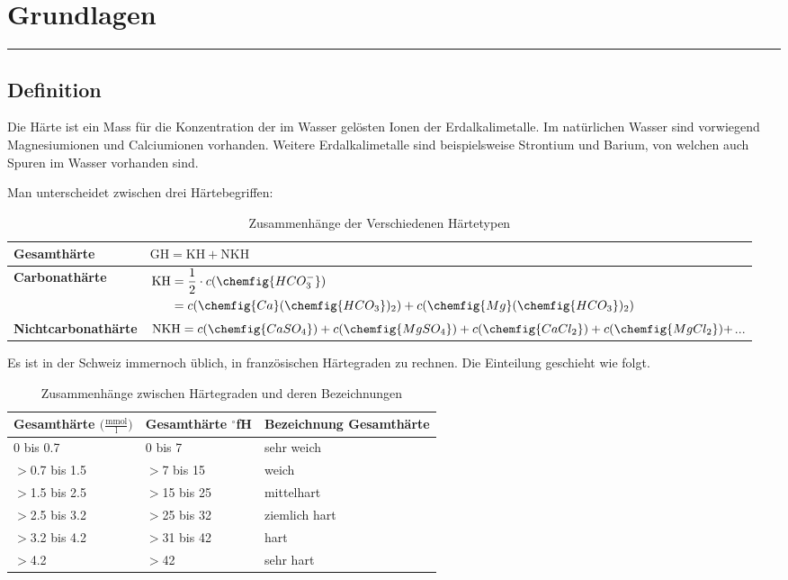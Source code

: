 \section{Grundlagen}

\rule{\linewidth}{0.5mm}
\subsection{Definition}
\begin{addmargin}[3cm]{0cm}

	Die Härte ist ein Mass für die Konzentration der im Wasser gelösten Ionen der Erdalkalimetalle. Im natürlichen Wasser sind vorwiegend Magnesiumionen und Calciumionen vorhanden.
	Weitere Erdalkalimetalle sind beispielsweise Strontium und Barium, von welchen auch Spuren im Wasser vorhanden sind.
	
	Man unterscheidet zwischen drei Härtebegriffen:
	
	\begin{table}[H]\centering
	\begin{tabular}{|p{4cm}|p{10cm}|}	
		\hline
		\bf{Gesamthärte}
			& $\mathrm{GH} = \mathrm{KH} + \mathrm{NKH}$ \\
		\hline
		\bf{Carbonathärte}
			& $\begin{aligned}
				\mathrm{KH} &= \frac{1}{2}\cdot c(\chemfig{HCO_{3}^{-}}) \\
							&= c(\chemfig{Ca}(\chemfig{HCO_3})_2) + c(\chemfig{Mg}(\chemfig{HCO_3})_2)
				\end{aligned}$ \\
		\hline
		\bf{Nichtcarbonathärte}
			& $\mathrm{NKH} = c(\chemfig{CaSO_{4}}) + c(\chemfig{MgSO_{4}}) + c(\chemfig{CaCl_{2}}) + c(\chemfig{MgCl_{2}}) +$...\\
		\hline
	\end{tabular}
	\caption[Zusammenhänge Härtetypen]{Zusammenhänge der Verschiedenen Härtetypen}
	\end{table}
	
	Es ist in der Schweiz immernoch üblich, in französischen Härtegraden zu rechnen. Die Einteilung geschieht wie folgt.
	
	\begin{table}[H]\centering
	\begin{tabular}{|m{4.1cm}|m{3.5cm}|m{6cm}|}	
		\hline
		\bf{Gesamthärte} $\Big(\frac{\mathrm{mmol}}{\mathrm{l}}\Big)$
			& \bf{Gesamthärte} $^\circ$fH
			& \bf{Bezeichnung Gesamthärte} \\
		\hline
		0 bis 0.7
			& 0 bis 7
			& sehr weich\\
		\hline
		$>$0.7 bis 1.5
			& $>$7 bis 15
			& weich \\
		\hline
		$>$1.5 bis 2.5
			& $>$15 bis 25
			& mittelhart \\
		\hline
		$>$2.5 bis 3.2
			& $>$25 bis 32
			& ziemlich hart \\
		\hline
		$>$3.2 bis 4.2
			& $>$31 bis 42
			& hart \\
		\hline
		$>$4.2  
			& $>$42
			& sehr hart \\
		\hline
	\end{tabular}
	\caption[Härtegrade]{Zusammenhänge zwischen Härtegraden und deren Bezeichnungen}
	

\end{table}
\end{addmargin}
